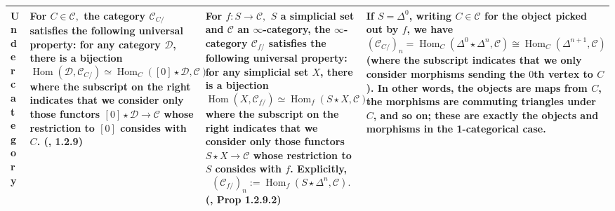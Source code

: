 \documentclass{article}
\DeclareMathOperator{\Hom}{Hom}
\begin{document}
\begin{landscape}
\begin{centre}
\begin{longtable}{ |p{3.2cm}||p{7cm}|p{7cm}|p{8cm}|  }
 Undercategory & For \(C \in \mathcal{C}, \) the category \(\mathcal{C}_{C/}\) satisfies the following universal property: for any category \(\mathcal{D}\), there is a bijection \[\Hom(\mathcal{D}, \mathcal{C}_{C/})\simeq \Hom_C([0]\star\mathcal{D}, \mathcal{C}),\] where the subscript on the right indicates that we consider only those functors \([0]\star\mathcal{D} \to \mathcal{C}\) whose restriction to \([0]\) consides with \(C\). (\autocite{htt}, 1.2.9) &  For \(f : S \to \mathcal{C}, \) \(S\) a simplicial set and \(\mathcal{C}\) an \(\infty\)-category, the \(\infty\)-category \(\mathcal{C}_{f/}\) satisfies the following universal property: for any simplicial set \(X\), there is a bijection \[\Hom(X, \mathcal{C}_{f/})\simeq \Hom_f(S\star X, \mathcal{C}),\] where the subscript on the right indicates that we consider only those functors \(S\star X \to \mathcal{C}\) whose restriction to \(S\) consides with \(f\). Explicitly, \[(\mathcal{C}_{f/})_n:=\Hom_f(S\star\Delta^n, \mathcal{C}).\]  (\autocite{htt}, Prop 1.2.9.2) & If \(S = \Delta^0\), writing \(C\in \mathcal{C}\) for the object picked out by \(f\), we have \((\mathcal{C}_{C/})_n=\Hom_C(\Delta^0\star\Delta^n, \mathcal{C})\cong\Hom_C(\Delta^{n+1}, \mathcal{C})\) (where the subscript indicates that we only consider morphisms sending the \(0\)th vertex to \(C\)). In other words, the objects are maps from \(C\), the morphisms are commuting triangles under \(C\), and so on; these are exactly the objects and morphisms in the 1-categorical case.\\
\hline
\end{longtable}
\end{centre}
\end{landscape}
\end{document}
